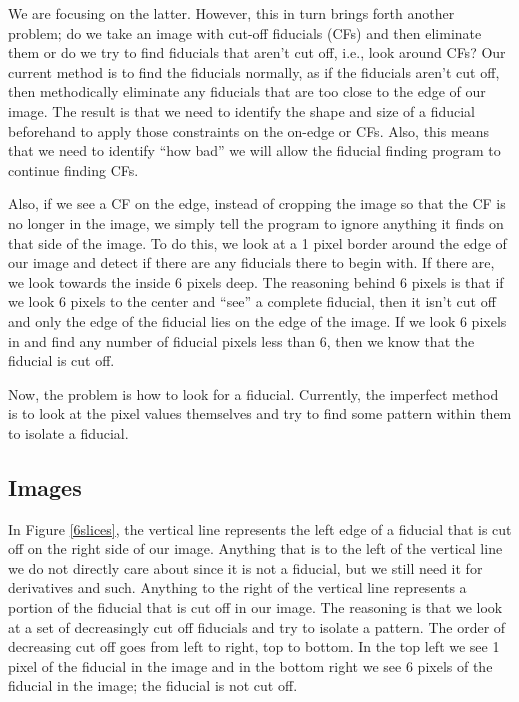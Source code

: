 \documentclass[10pt]{scrartcl}
\begin{document}
     We are focusing on the latter. However, this in turn brings forth another problem; do we take an image with cut-off fiducials (CFs) and then eliminate them or do we try to find fiducials that aren't cut off, i.e., look around CFs? Our current method is to find the fiducials normally, as if the fiducials aren't cut off, then methodically eliminate any fiducials that are too close to the edge of our image. The result is that we need to identify the shape and size of a fiducial beforehand to apply those constraints on the on-edge or CFs. Also, this means that we need to identify ``how bad'' we will allow the fiducial finding program to continue finding CFs.

     Also, if we see a CF on the edge, instead of cropping the image so that the CF is no longer in the image, we simply tell the program to ignore anything it finds on that side of the image. To do this, we look at a 1 pixel border around the edge of our image and detect if there are any fiducials there to begin with. If there are, we look towards the inside 6 pixels deep. The reasoning behind 6 pixels is that if we look 6 pixels to the center and ``see'' a complete fiducial, then it isn't cut off and only the edge of the fiducial lies on the edge of the image. If we look 6 pixels in and find any number of fiducial pixels less than 6, then we know that the fiducial is cut off. 

     Now, the problem is how to look for a fiducial. Currently, the imperfect method is to look at the pixel values themselves and try to find some pattern within them to isolate a fiducial. 


\subsection{Images} %
\label{sub:images}

In Figure \ref{6slices}, the vertical line represents the left edge of a fiducial that is cut off on the right side of our image. Anything that is to the left of the vertical line we do not directly care about since it is not a fiducial, but we still need it for derivatives and such. Anything to the right of the vertical line represents a portion of the fiducial that is cut off in our image. The reasoning is that we look at a set of decreasingly cut off fiducials and try to isolate a pattern. The order of decreasing cut off goes from left to right, top to bottom. In the top left we see 1 pixel of the fiducial in the image and in the bottom right we see 6 pixels of the fiducial in the image; the fiducial is not cut off. 
\end{document}
